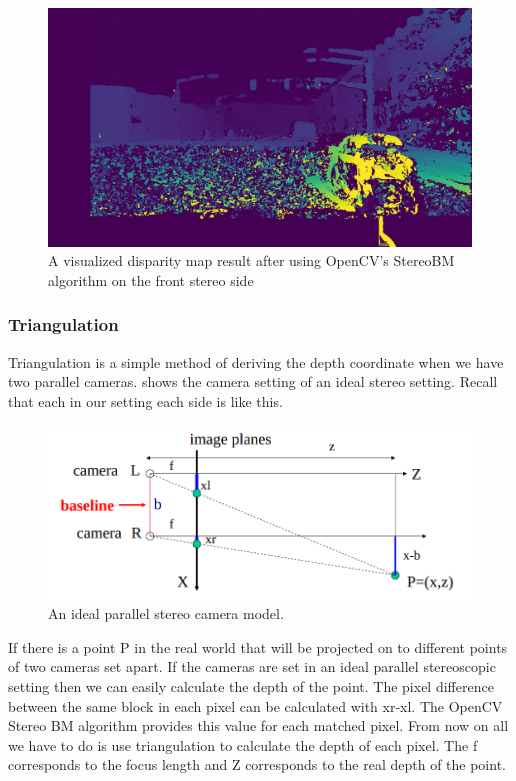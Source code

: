 \begin{figure}[!ht]
    \centering
    \includegraphics[width=150mm, keepaspectratio]{figures/335DP.jpg}
    \caption{A visualized disparity map result after using OpenCV's StereoBM algorithm on the front stereo side}
    \label{fig:disparitymap}
\end{figure}

\subsubsection{Triangulation}

Triangulation is a simple method of deriving the depth coordinate when we have
two parallel cameras.  shows the camera setting of
an ideal stereo setting. Recall that each in our setting each side is like
this.

\begin{figure}[!ht]
    \centering
    \includegraphics[width=150mm, keepaspectratio]{figures/triangulation.png}
    \caption{An ideal parallel stereo camera model.}
    \label{fig:triangulation}
\end{figure}

If there is a point P in the real world that will be projected on to different
points of two cameras set apart. If the cameras are set in an ideal parallel
stereoscopic setting then we can easily calculate the depth of the point. The
pixel difference between the same block in each pixel can be calculated with
xr-xl. The OpenCV Stereo BM algorithm provides this value for each matched
pixel. From now on all we have to do is use triangulation to calculate the depth
of each pixel. The f corresponds to the focus length and Z corresponds to the
real depth of the point.


